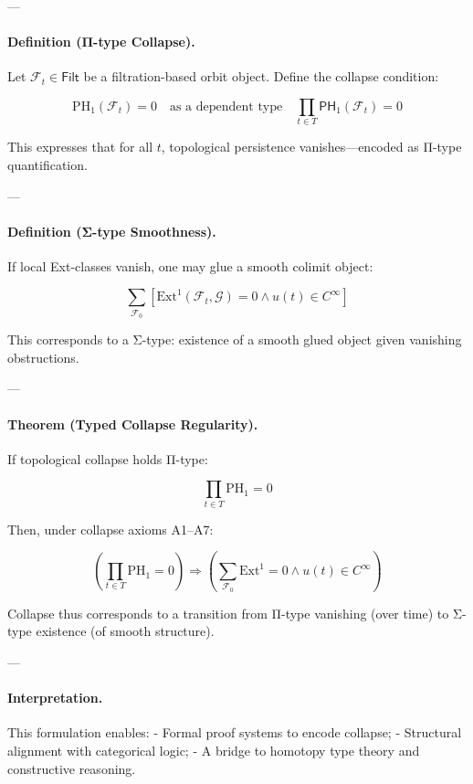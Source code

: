 \documentclass[11pt]{article}
\begin{document}
\begin{axiom}
\begin{axiom}
---

\paragraph{Definition (Π-type Collapse).}
Let \( \mathcal{F}_t \in \mathsf{Filt} \) be a filtration-based orbit object.  
Define the collapse condition:

\[
\mathrm{PH}_1(\mathcal{F}_t) = 0
\quad \text{as a dependent type} \quad
\prod_{t \in T} \mathsf{PH}_1(\mathcal{F}_t) = 0
\]

This expresses that for all \( t \), topological persistence vanishes—encoded as Π-type quantification.

---

\paragraph{Definition (Σ-type Smoothness).}
If local Ext-classes vanish, one may glue a smooth colimit object:

\[
\sum_{\mathcal{F}_0} \left[ \mathrm{Ext}^1(\mathcal{F}_t, \mathcal{G}) = 0 \wedge u(t) \in C^\infty \right]
\]

This corresponds to a Σ-type: existence of a smooth glued object given vanishing obstructions.

---

\paragraph{Theorem (Typed Collapse Regularity).}
If topological collapse holds Π-type:

\[
\prod_{t \in T} \mathrm{PH}_1 = 0
\]

Then, under collapse axioms A1–A7:

\[
\boxed{
\left( \prod_{t \in T} \mathrm{PH}_1 = 0 \right)
\Rightarrow
\left( \sum_{\mathcal{F}_0} \mathrm{Ext}^1 = 0 \wedge u(t) \in C^\infty \right)
}
\]

Collapse thus corresponds to a transition from Π-type vanishing (over time) to Σ-type existence (of smooth structure).

---

\paragraph{Interpretation.}
This formulation enables:
- Formal proof systems to encode collapse;
- Structural alignment with categorical logic;
- A bridge to homotopy type theory and constructive reasoning.


\end{axiom}
\end{axiom}
\end{document}
